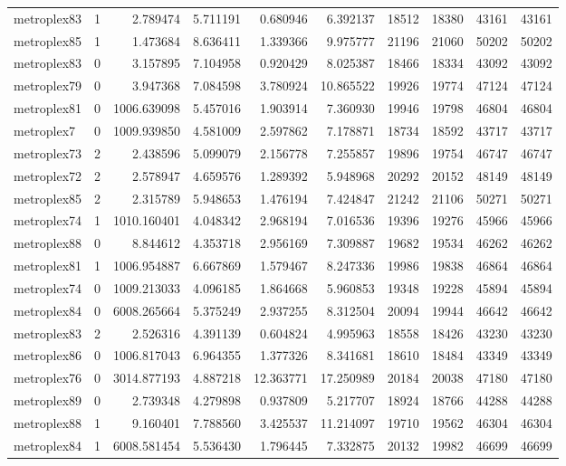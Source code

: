 \begin{longtable}{|l|r|r|r|r|r|r|r|r|r|}
metroplex83 & 1 & 2.789474 & 5.711191 & 0.680946 & 6.392137 & 18512 & 18380 & 43161 & 43161 \\
metroplex85 & 1 & 1.473684 & 8.636411 & 1.339366 & 9.975777 & 21196 & 21060 & 50202 & 50202 \\
metroplex83 & 0 & 3.157895 & 7.104958 & 0.920429 & 8.025387 & 18466 & 18334 & 43092 & 43092 \\
metroplex79 & 0 & 3.947368 & 7.084598 & 3.780924 & 10.865522 & 19926 & 19774 & 47124 & 47124 \\
metroplex81 & 0 & 1006.639098 & 5.457016 & 1.903914 & 7.360930 & 19946 & 19798 & 46804 & 46804 \\
metroplex7 & 0 & 1009.939850 & 4.581009 & 2.597862 & 7.178871 & 18734 & 18592 & 43717 & 43717 \\
metroplex73 & 2 & 2.438596 & 5.099079 & 2.156778 & 7.255857 & 19896 & 19754 & 46747 & 46747 \\
metroplex72 & 2 & 2.578947 & 4.659576 & 1.289392 & 5.948968 & 20292 & 20152 & 48149 & 48149 \\
metroplex85 & 2 & 2.315789 & 5.948653 & 1.476194 & 7.424847 & 21242 & 21106 & 50271 & 50271 \\
metroplex74 & 1 & 1010.160401 & 4.048342 & 2.968194 & 7.016536 & 19396 & 19276 & 45966 & 45966 \\
metroplex88 & 0 & 8.844612 & 4.353718 & 2.956169 & 7.309887 & 19682 & 19534 & 46262 & 46262 \\
metroplex81 & 1 & 1006.954887 & 6.667869 & 1.579467 & 8.247336 & 19986 & 19838 & 46864 & 46864 \\
metroplex74 & 0 & 1009.213033 & 4.096185 & 1.864668 & 5.960853 & 19348 & 19228 & 45894 & 45894 \\
metroplex84 & 0 & 6008.265664 & 5.375249 & 2.937255 & 8.312504 & 20094 & 19944 & 46642 & 46642 \\
metroplex83 & 2 & 2.526316 & 4.391139 & 0.604824 & 4.995963 & 18558 & 18426 & 43230 & 43230 \\
metroplex86 & 0 & 1006.817043 & 6.964355 & 1.377326 & 8.341681 & 18610 & 18484 & 43349 & 43349 \\
metroplex76 & 0 & 3014.877193 & 4.887218 & 12.363771 & 17.250989 & 20184 & 20038 & 47180 & 47180 \\
metroplex89 & 0 & 2.739348 & 4.279898 & 0.937809 & 5.217707 & 18924 & 18766 & 44288 & 44288 \\
metroplex88 & 1 & 9.160401 & 7.788560 & 3.425537 & 11.214097 & 19710 & 19562 & 46304 & 46304 \\
metroplex84 & 1 & 6008.581454 & 5.536430 & 1.796445 & 7.332875 & 20132 & 19982 & 46699 & 46699 \\

\end{longtable}
